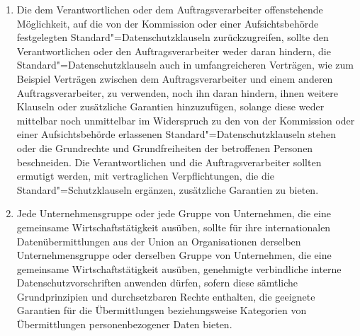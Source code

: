 \begin{enumerate}

   \item Die dem Verantwortlichen oder dem Auftragsverarbeiter offenstehende Möglichkeit, auf die von der Kommission
    oder einer Aufsichtsbehörde festgelegten Standard"=Datenschutzklauseln zurückzugreifen, sollte den Verantwortlichen
    oder den Auftragsverarbeiter weder daran hindern, die Standard"=Datenschutzklauseln auch in umfangreicheren
    Verträgen, wie zum Beispiel Verträgen zwischen dem Auftragsverarbeiter und einem anderen Auftragsverarbeiter, zu
    verwenden, noch ihn daran hindern, ihnen weitere Klauseln oder zusätzliche Garantien hinzuzufügen, solange diese
    weder mittelbar noch unmittelbar im Widerspruch zu den von der Kommission oder einer Aufsichtsbehörde erlassenen
    Standard"=Datenschutzklauseln stehen oder die Grundrechte und Grundfreiheiten der betroffenen Personen beschneiden.
    Die Verantwortlichen und die Auftragsverarbeiter sollten ermutigt werden, mit vertraglichen Verpflichtungen, die
    die Standard"=Schutzklauseln ergänzen, zusätzliche Garantien zu bieten.%
   \label{itm:eg-109}
   

   \item Jede Unternehmensgruppe oder jede Gruppe von Unternehmen, die eine gemeinsame Wirtschaftstätigkeit ausüben,
    sollte für ihre internationalen Datenübermittlungen aus der Union an Organisationen derselben Unternehmensgruppe
    oder derselben Gruppe von Unternehmen, die eine gemeinsame Wirtschaftstätigkeit ausüben, genehmigte verbindliche
    interne Datenschutzvorschriften anwenden dürfen, sofern diese sämtliche Grundprinzipien und durchsetzbaren Rechte
    enthalten, die geeignete Garantien für die Übermittlungen beziehungsweise Kategorien von Übermittlungen
    personenbezogener Daten bieten.%
   \label{itm:eg-110}
   


\end{enumerate}
